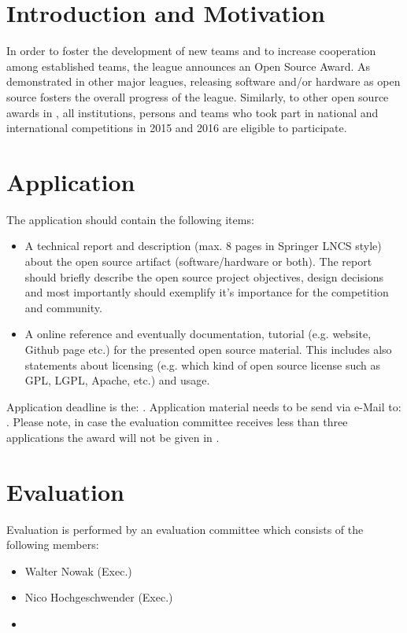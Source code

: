 \section{Introduction and Motivation}
In order to foster the development of new teams and to increase cooperation among established teams, the league announces an Open Source Award. As demonstrated
in other \RC major leagues, releasing software and/or hardware as open source fosters the overall progress of the league. Similarly, to other open source awards in \RC, all institutions, persons and teams who took part in national and international \RCAW competitions in 2015 and 2016 are eligible to participate. 

\section{Application}
The application should contain the following items: 

\begin{itemize}
	\item A technical report and description (max. 8 pages in Springer LNCS style) about the open source artifact (software/hardware or both). The report should briefly describe the open source project objectives, design decisions and most importantly should exemplify it's importance for the \RCAW competition and community.   
	\item A online reference and eventually documentation, tutorial (e.g. website, Github page etc.) for the presented open source material. This includes also statements about licensing (e.g. which kind of open source license such as GPL, LGPL, Apache, etc.) and usage.  
\end{itemize}

Application deadline is the: . Application material needs to be send via e-Mail to: . Please note, in case the evaluation committee receives less than three applications the award will not be given in \YEAR. 

\section{Evaluation}
Evaluation is performed by an evaluation committee which consists of the following members:

\begin{itemize}
	\item Walter Nowak (\RCAW Exec.)
	\item Nico Hochgeschwender (\RCAW Exec.)
	\item {}
\end{itemize}

